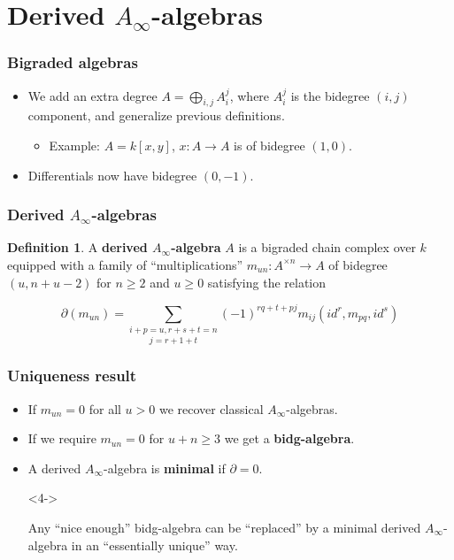 \documentclass{beamer}
\theoremstyle{definition}
\newtheorem{defi}{Definition}
\begin{document}
\section{Derived $A_\infty$-algebras}

\begin{frame}
\frametitle{Bigraded algebras}
\begin{itemize}
\item We add an extra degree $A=\bigoplus_{i,j} A_i^j$, where $A_i^j$ is the bidegree $(i,j)$ component, and generalize previous definitions.
\begin{itemize}
\item<2-> Example: $A=k[x,y]$, $x:A\to A$ is of bidegree $(1,0)$.
\end{itemize}
\item<3-> Differentials now have bidegree $(0,-1)$. 
\end{itemize}
\end{frame}

\begin{frame}
\frametitle{Derived $A_\infty$-algebras}
\begin{defi}
A \textbf{derived $A_\infty$-algebra} $A$ is a bigraded  chain complex over $k$ equipped with a family of ``multiplications'' $m_{un}:A^{\times n}\to A$ of bidegree $(u,n+u-2)$ for $n\geq 2$ and $u\geq 0$ satisfying the relation

\[\partial(m_{un})=\underset{j=r+1+t}{\sum_{i+p=u,r+s+t=n}}(-1)^{rq+t+pj}m_{ij}(id^{ r}, m_{pq}, id^{ s})\] %
\end{defi}
\end{frame}


\begin{frame}
\frametitle{Uniqueness result}
\begin{itemize}
\item If $m_{un}=0$ for all $u>0$ we recover classical $A_\infty$-algebras.
\item<2-> If we require $m_{un}=0$ for $u+n\geq 3$ we get a \textbf{bidg-algebra}. %
\item<3-> A derived $A_\infty$-algebra is \textbf{minimal} if $\partial=0$. 
\item[]<4->
\begin{theorem}[Sagave]
Any ``nice enough'' bidg-algebra can be ``replaced'' by a minimal derived $A_\infty$-algebra in an ``essentially unique'' way.
\end{theorem}
\end{itemize}
\end{frame}
\end{document}
